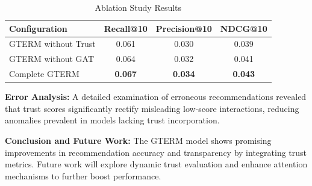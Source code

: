 \begin{table}[h]
\centering
\label{tab:ablation}
\begin{tabular}{lccc}
\hline
Configuration & Recall@10 & Precision@10 & NDCG@10 \\
\hline
GTERM without Trust & 0.061 & 0.030 & 0.039 \\
GTERM without GAT & 0.064 & 0.032 & 0.041 \\
Complete GTERM & \textbf{0.067} & \textbf{0.034} & \textbf{0.043} \\
\hline
\end{tabular}
\caption{Ablation Study Results}
\end{table}

\textbf{Error Analysis:} A detailed examination of erroneous recommendations revealed that trust scores significantly rectify misleading low-score interactions, reducing anomalies prevalent in models lacking trust incorporation.

\textbf{Conclusion and Future Work:} The GTERM model shows promising improvements in recommendation accuracy and transparency by integrating trust metrics. Future work will explore dynamic trust evaluation and enhance attention mechanisms to further boost performance.

